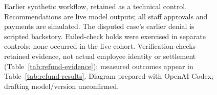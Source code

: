 \begin{figure}[!htbp]
\caption{Earlier synthetic workflow, retained as a technical control. Recommendations are live model outputs; all staff approvals and payments are simulated. The disputed case's earlier denial is scripted backstory. Failed-check holds were exercised in separate controls; none occurred in the live cohort. Verification checks retained evidence, not actual employee identity or settlement (Table~\ref{tab:refund-evidence}); measured outcomes appear in Table~\ref{tab:refund-results}. Diagram prepared with OpenAI Codex; drafting model/version unconfirmed.}
\label{fig:refund-workflow}
\end{figure}

